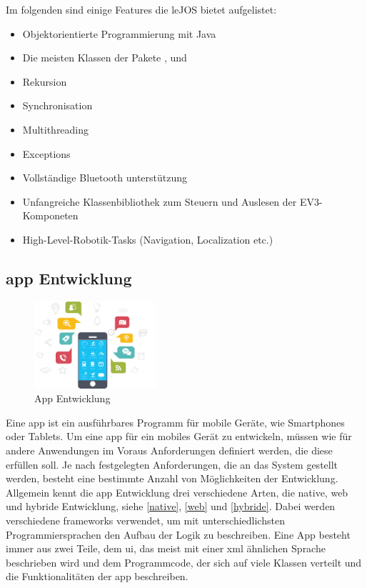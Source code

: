 Im folgenden sind einige Features die leJOS bietet aufgelistet:
\begin{itemize}
	\item{Objektorientierte Programmierung mit Java}
	\item{Die meisten Klassen der Pakete ,  und }
	\item{Rekursion}
	\item{Synchronisation}
	\item{Multithreading}
	\item{Exceptions}
	\item{Vollständige Bluetooth unterstützung}
	\item{Unfangreiche Klassenbibliothek zum Steuern und Auslesen der EV3-Komponeten}
	\item{High-Level-Robotik-Tasks (Navigation, Localization etc.)}
\end{itemize}

\newpage
\color{finishing}
\subsection{\gls{app} Entwicklung} %

\begin{figure}
	\begin{center}
		\includegraphics[width=0.4\textwidth]{images/technische_grundlagen/App-Development.jpg}
	\end{center}
	\caption{App Entwicklung}
	\label{fig:appentwicklung}
\end{figure}

Eine \gls{app} ist ein ausführbares Programm für mobile Geräte, wie Smartphones oder Tablets. Um eine \gls{app} für ein mobiles Gerät zu entwickeln, müssen wie für andere Anwendungen im Voraus Anforderungen definiert werden, die diese erfüllen soll. Je nach festgelegten Anforderungen, die an das System gestellt werden, besteht eine bestimmte Anzahl von Möglichkeiten der Entwicklung. Allgemein kennt die \gls{app} Entwicklung drei verschiedene Arten, die native, web und hybride Entwicklung, siehe \eqref{native}, \eqref{web} und \eqref{hybride}. Dabei werden verschiedene \glspl{framework} verwendet, um mit unterschiedlichsten Programmiersprachen den Aufbau der Logik zu beschreiben. Eine App besteht immer aus zwei Teile, dem \gls{ui}, das meist mit einer \gls{xml} ähnlichen Sprache beschrieben wird und dem Programmcode, der sich auf viele Klassen verteilt und die Funktionalitäten der \gls{app} beschreiben.

